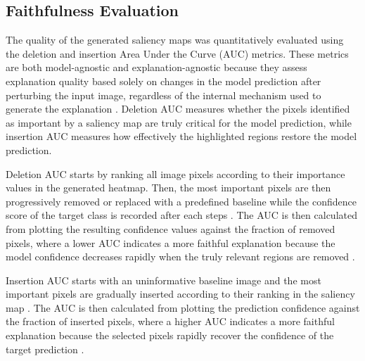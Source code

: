 \documentclass[conference]{IEEEtran}
\begin{document}
\subsection{Faithfulness Evaluation}

The quality of the generated saliency maps was quantitatively evaluated using the deletion and insertion Area Under the Curve (AUC) metrics. These metrics are both model-agnostic and explanation-agnostic because they assess explanation quality based solely on changes in the model prediction after perturbing the input image, regardless of the internal mechanism used to generate the explanation \cite{petsiuk2018riserandomizedinputsampling, Skliarov2025}. Deletion AUC measures whether the pixels identified as important by a saliency map are truly critical for the model prediction, while insertion AUC measures how effectively the highlighted regions restore the model prediction.

Deletion AUC starts by ranking all image pixels according to their importance values in the generated heatmap. Then, the most important pixels are then progressively removed or replaced with a predefined baseline while the confidence score of the target class is recorded after each steps \cite{petsiuk2018riserandomizedinputsampling}. The AUC is then calculated from plotting the resulting confidence values against the fraction of removed pixels, where a lower AUC indicates a more faithful explanation because the model confidence decreases rapidly when the truly relevant regions are removed \cite{Cheng2025}.

Insertion AUC starts with an uninformative baseline image and the most important pixels are gradually inserted according to their ranking in the saliency map \cite{petsiuk2018riserandomizedinputsampling}. The AUC is then calculated from plotting the prediction confidence against the fraction of inserted pixels, where a higher AUC indicates a more faithful explanation because the selected pixels rapidly recover the confidence of the target prediction \cite{Cheng2025}.



\end{document}
